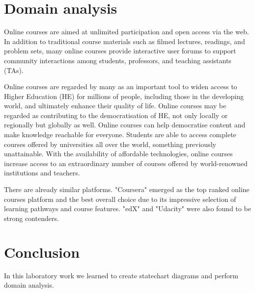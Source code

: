 \documentclass[12pt,a4paper,titlepage]{article}
\begin{document}
\section{Domain analysis}
Online courses are aimed at unlimited participation and open access via the web. In addition to traditional course materials such as filmed lectures, readings, and problem sets, many online courses provide interactive user forums to support community interactions among students, professors, and teaching assistants (TAs).\par
Online courses are regarded by many as an important tool to widen access to Higher Education (HE) for millions of people, including those in the developing world, and ultimately enhance their quality of life. Online courses may be regarded as contributing to the democratisation of HE, not only locally or regionally but globally as well. Online courses can help democratise content and make knowledge reachable for everyone. Students are able to access complete courses offered by universities all over the world, something previously unattainable. With the availability of affordable technologies, online courses increase access to an extraordinary number of courses offered by world-renowned institutions and teachers.\par
There are already similar platforms. "Coursera" emerged as the top ranked online courses platform and the best overall choice due to its impressive selection of learning pathways and course features. "edX" and "Udacity" were also found to be strong contenders.
\section{Conclusion}
In this laboratory work we learned to create statechart diagrams and perform domain analysis.

\clearpage
\cleardoublepage
\end{document}
